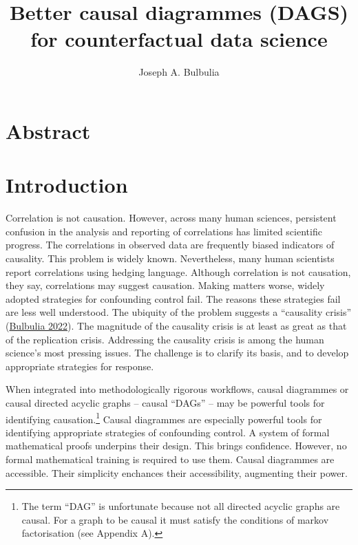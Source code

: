\documentclass[
  singlecolumn]{report}
\title{Better causal diagrammes (DAGS) for counterfactual data science}
\author{Joseph A. Bulbulia}
\date{}
\begin{document}
\maketitle
\ifdefined\Shaded\renewenvironment{Shaded}{\begin{tcolorbox}[borderline west={3pt}{0pt}{shadecolor}, enhanced, boxrule=0pt, interior hidden, frame hidden, sharp corners, breakable]}{\end{tcolorbox}}\fi

\listoffigures
\listoftables
\hypertarget{abstract}{%
\section{Abstract}\label{abstract}}

\hypertarget{introduction}{%
\section{Introduction}\label{introduction}}

Correlation is not causation. However, across many human sciences,
persistent confusion in the analysis and reporting of correlations has
limited scientific progress. The correlations in observed data are
frequently biased indicators of causality. This problem is widely known.
Nevertheless, many human scientists report correlations using hedging
language. Although correlation is not causation, they say, correlations
may suggest causation. Making matters worse, widely adopted strategies
for confounding control fail. The reasons these strategies fail are less
well understood. The ubiquity of the problem suggests a ``causality
crisis'' (\protect\hyperlink{ref-bulbulia2022}{Bulbulia 2022}). The
magnitude of the causality crisis is at least as great as that of the
replication crisis. Addressing the causality crisis is among the human
science's most pressing issues. The challenge is to clarify its basis,
and to develop appropriate strategies for response.

When integrated into methodologically rigorous workflows, causal
diagrammes or causal directed acyclic graphs -- causal ``DAGs'' -- may
be powerful tools for identifying causation.\footnote{The term ``DAG''
  is unfortunate because not all directed acyclic graphs are causal. For
  a graph to be causal it must satisfy the conditions of markov
  factorisation (see Appendix A).} Causal diagrammes are especially
powerful tools for identifying appropriate strategies of confounding
control. A system of formal mathematical proofs underpins their design.
This brings confidence. However, no formal mathematical training is
required to use them. Causal diagrammes are accessible. Their simplicity
enchances their accessibility, augmenting their power.
\end{document}
